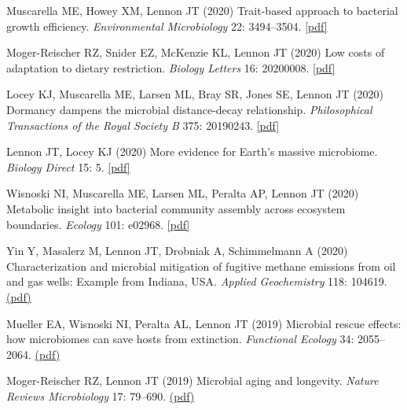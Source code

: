 \documentclass[11pt]{article}
\begin{document}
\begin{etaremune}
\item Muscarella ME, Howey XM, Lennon JT (2020) Trait-based approach to bacterial growth efficiency. \textit{Environmental Microbiology} 22: 3494–3504. \href{https://lennonlab.github.io/assets/publications/Muscarella_etal_2020.pdf}{[pdf]}

\item Moger-Reischer RZ, Snider EZ, McKenzie KL, Lennon JT (2020) Low costs of adaptation to dietary restriction. \textit{Biology Letters} 16: 20200008. \href{https://lennonlab.github.io/assets/publications/Moger-Reischer_etal_2020.pdf}{[pdf]}

\item Locey KJ, Muscarella ME, Larsen ML, Bray SR, Jones SE, Lennon JT (2020) Dormancy dampens the microbial distance-decay relationship. \textit{Philosophical Transactions of the Royal Society B} 375: 20190243. \href{https://lennonlab.github.io/assets/publications/Locey_etal_2020.pdf}{[pdf]}

\item Lennon JT, Locey KJ (2020) More evidence for Earth's massive microbiome. \textit{Biology Direct} 15: 5. \href{https://lennonlab.github.io/assets/publications/Lennon_Locey_2020.pdf}{[pdf]}

\item Wisnoski NI, Muscarella ME, Larsen ML, Peralta AP, Lennon JT (2020) Metabolic insight into bacterial community assembly across ecosystem boundaries. \textit{Ecology} 101: e02968. \href{https://lennonlab.github.io/assets/publications/Wisnoski_etal_2020.pdf}{[pdf]}

\item Yin Y, Masalerz M, Lennon JT, Drobniak A, Schimmelmann A (2020) Characterization and microbial mitigation of fugitive methane emissions from oil and gas wells: Example from Indiana, USA. \textit{Applied Geochemistry} 118: 104619. \href{https://lennonlab.github.io/assets/publications/Yin_etal_2020.pdf}{(pdf)}

\item Mueller EA, Wisnoski NI, Peralta AL, Lennon JT (2019) Microbial rescue effects: how microbiomes can save hosts from extinction. \textit{Functional Ecology} 34: 2055--2064. \href{https://lennonlab.github.io/assets/publications/Mueller_etal_2019.pdf}{(pdf)}

\item Moger-Reischer RZ, Lennon JT (2019) Microbial aging and longevity. \textit{Nature Reviews Microbiology} 17: 79--690. \href{https://lennonlab.github.io/assets/publications/Moger-Reischer_Lennon_2019.pdf}{(pdf)}


\end{etaremune}
\end{document}
